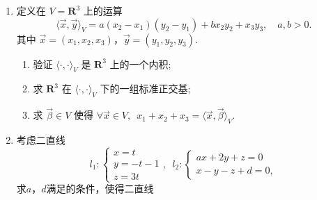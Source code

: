 \begin{enumerate}
    \item 定义在 $ V = \mathbf{R}^3 $ 上的运算
    \[ \langle \vec{x}, \vec{y} \rangle_V = a(x_2-x_1)(y_2-y_1)+bx_2y_2+x_3y_3, \quad a,b>0. \]
    其中 $ \vec{x} = (x_1, x_2, x_3) $，$ \vec{y} = (y_1, y_2, y_3) $.
    \begin{enumerate}
        \item 验证 $ \langle \cdot, \cdot \rangle_V $ 是 $ \mathbf{R}^3 $ 上的一个内积;

        \item 求 $ \mathbf{R}^3 $ 在 $ \langle \cdot, \cdot \rangle_V $ 下的一组标准正交基;

        \item 求 $ \vec{\beta} \in V $ 使得 $ \forall \vec{x} \in V,\enspace x_1 + x_2 + x_3 = \langle \vec{x}, \vec{\beta} \rangle_V $.
    \end{enumerate}

\item 考虑二直线
    \[l_1\colon \begin{cases}
        x=t \\ y=-t-1 \\ z=3t
    \end{cases},\enspace l_2\colon \begin{cases}
        ax+2y+z=0 \\ x-y-z+d=0,
    \end{cases}\]
    求$a$，$d$满足的条件，使得二直线

\end{enumerate}

\clearpage
